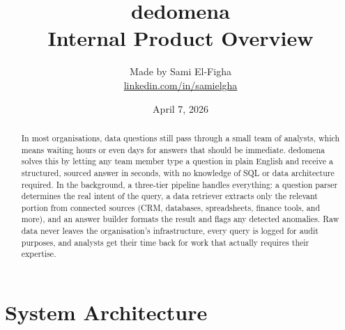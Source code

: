 \documentclass[12pt, a4paper]{article}
\title{%
  \textbf{dedomena}\\[0.4em]
  \large Internal Product Overview
}
\author{%
  Made by Sami El-Figha\\[0.2em]
  \small\href{https://linkedin.com/in/samielgha}{linkedin.com/in/samielgha}
}
\date{April 7, 2026}
\begin{document}
\maketitle
\thispagestyle{plain}

\begin{abstract}
In most organisations, data questions still pass through a small team of analysts,
which means waiting hours or even days for answers that should be immediate.
dedomena solves this by letting any team member type a question in plain English
and receive a structured, sourced answer in seconds, with no knowledge of SQL or
data architecture required. In the background, a three-tier pipeline handles
everything: a question parser determines the real intent of the query, a data
retriever extracts only the relevant portion from connected sources (CRM,
databases, spreadsheets, finance tools, and more), and an answer builder formats
the result and flags any detected anomalies. Raw data never leaves the
organisation's infrastructure, every query is logged for audit purposes, and
analysts get their time back for work that actually requires their expertise.
\end{abstract}

\section*{System Architecture}
\end{document}
